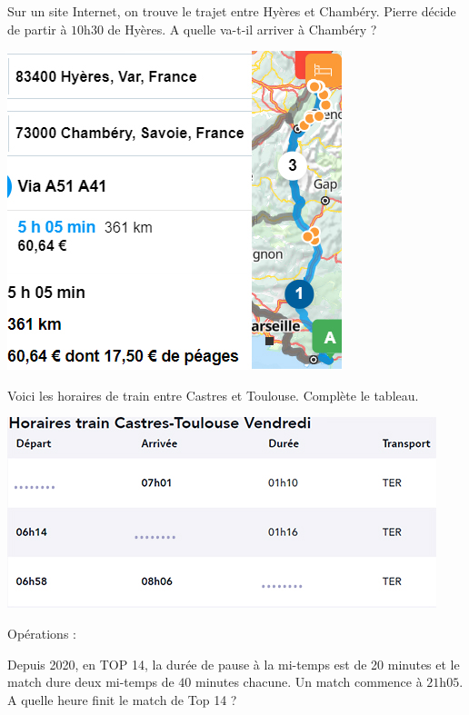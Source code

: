 \begin{pageParcoursd}
\begin{minipage}{0.62\linewidth}
 Sur un site Internet, on trouve le trajet entre Hyères et Chambéry. Pierre décide de partir à $10$h$30$ de Hyères. A quelle va-t-il arriver à Chambéry ?
\end{minipage}
\hfill 
\begin{minipage}{0.35\linewidth}
  \includegraphics[scale=0.7]{FIG/grandeurs_mesures/via_michelin.jpg} 
\end{minipage}


 
 Voici les horaires de train entre Castres et Toulouse. Complète le tableau.
 
 \begin{minipage}{0.5\linewidth}
 \includegraphics[scale=1]{FIG/grandeurs_mesures/castres_toulourse_train.jpg} 
 \end{minipage}
\begin{minipage}{0.5\linewidth}
  Opérations :
  \vspace{5cm}
\end{minipage}
 




Depuis 2020, en TOP 14, la durée de pause à la mi-temps est de 20 minutes et le match dure deux mi-temps de $40$ minutes chacune. Un match commence à $21$h$05$.  A quelle heure finit le match de Top 14 ? 


 
\end{pageParcoursd}
